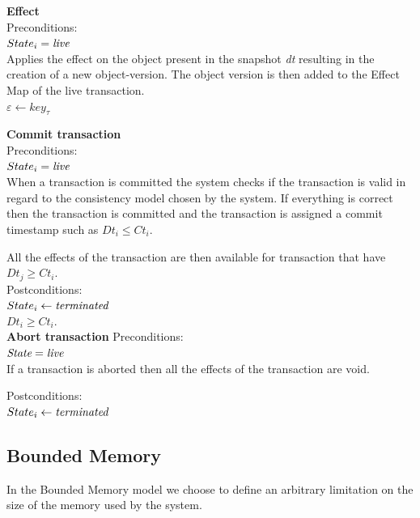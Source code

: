 \documentclass[systeme,french,english]{compas2022}
\begin{document}
\textbf{Effect}\\
Preconditions:\\ 
$State_i = \emph{live}$ \\

Applies the effect on the object present in the snapshot \emph{dt} resulting in the creation of a new object-version.
The object version is then added to the Effect Map of the live transaction.\\
$\varepsilon \leftarrow key_{\tau}$

\textbf{Commit transaction}\\
Preconditions:\\ 
$State_i = \emph{live}$ \\

When a transaction is committed the system checks if the transaction is valid in regard to the consistency model chosen by the system.
If everything is correct then the transaction is committed and the transaction is assigned a commit timestamp such as $Dt_i \leq Ct_i$.

All the effects of the transaction are then available for transaction that have $Dt_j \geq Ct_i$.\\

Postconditions:\\
$State_i \leftarrow \emph{terminated}$ \\
$Dt_i \geq Ct_i$.\\



\textbf{Abort transaction}
Preconditions:\\ 
$\emph{State} = \emph{live}$ \\

If a transaction is aborted then all the effects of the transaction are void.

Postconditions:\\
$State_i \leftarrow \emph{terminated}$ \\

\subsection{Bounded Memory}

In the Bounded Memory model we choose to define an arbitrary limitation on the size of the memory used by the system.
\end{document}
